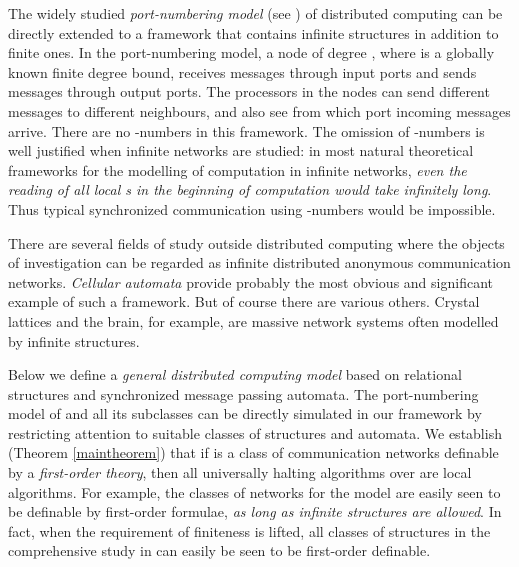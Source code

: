 \documentclass[copyright,creativecommons]{eptcs}
\begin{document}
The widely studied \emph{port-numbering model} (see \cite{angluin, hella, hella2})
of distributed computing can be directly extended to a framework that contains infinite structures
in addition to finite ones.
In the port-numbering model, a node of degree , where  is a globally known
finite degree bound, receives messages through  input ports
and sends messages through  output ports.
The processors in the nodes can send different messages to different neighbours,
and also see from which port incoming messages arrive.
There are no -numbers 
in this framework. The omission of -numbers is well justified when infinite
networks are studied: in most natural theoretical frameworks for the
modelling of computation in infinite networks,
\emph{even the reading of all local s in the 
beginning of computation would take infinitely long}. Thus typical synchronized
communication using -numbers would be impossible.




There are several fields of study outside distributed computing
where the objects of investigation can be regarded as infinite
distributed anonymous communication networks.
\emph{Cellular automata}
provide probably the most
obvious and significant example of such a framework.
But of course there are various others.
Crystal lattices and the brain, for example, are 
massive network systems often modelled by infinite structures.




Below we define a \emph{general  
distributed computing model} based on relational structures and synchronized message passing automata.
The port-numbering model  of \cite{hella, hella2} and all its subclasses can be directly
simulated in our framework by restricting attention to suitable
classes of structures and automata.
We establish (Theorem \ref{maintheorem}\hspace{0.4mm}) that if  is a class of
communication networks definable by a 
\emph{first-order theory}, then all universally halting algorithms over  are local algorithms.
For example, the classes of networks for the  model are easily seen to be definable by
first-order formulae, \emph{as long as infinite structures are allowed}.
In fact, when the requirement of finiteness is lifted,
all classes of structures in the comprehensive study
in \cite{hella, hella2} can easily be seen to be first-order definable.
\end{document}
